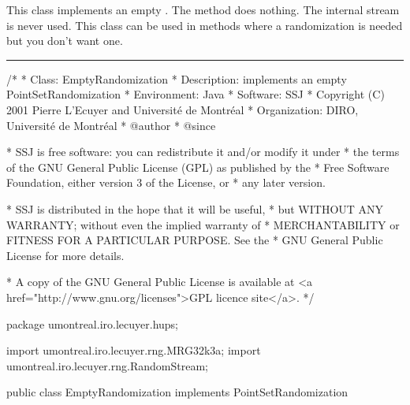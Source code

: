 
This class implements an empty
.
 The method  does nothing.
The internal stream is never used.
This class can be used in methods where a randomization is needed
but you don't want one.

\bigskip\hrule\bigskip

\begin{code}
\begin{hide}
/*
 * Class:        EmptyRandomization
 * Description:  implements an empty PointSetRandomization
 * Environment:  Java
 * Software:     SSJ 
 * Copyright (C) 2001  Pierre L'Ecuyer and Université de Montréal
 * Organization: DIRO, Université de Montréal
 * @author       
 * @since

 * SSJ is free software: you can redistribute it and/or modify it under
 * the terms of the GNU General Public License (GPL) as published by the
 * Free Software Foundation, either version 3 of the License, or
 * any later version.

 * SSJ is distributed in the hope that it will be useful,
 * but WITHOUT ANY WARRANTY; without even the implied warranty of
 * MERCHANTABILITY or FITNESS FOR A PARTICULAR PURPOSE.  See the
 * GNU General Public License for more details.

 * A copy of the GNU General Public License is available at
   <a href="http://www.gnu.org/licenses">GPL licence site</a>.
 */
\end{hide}
package umontreal.iro.lecuyer.hups;
\begin{hide}
 import umontreal.iro.lecuyer.rng.MRG32k3a;
 import umontreal.iro.lecuyer.rng.RandomStream;

\end{hide}
public class EmptyRandomization implements PointSetRandomization\begin{hide} {
   protected RandomStream stream = new MRG32k3a();
\end{hide}
\end{code}

